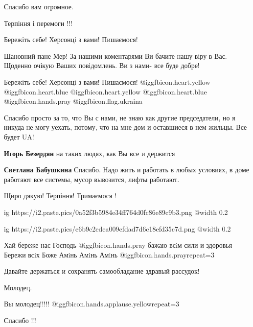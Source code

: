 \begin{itemize}
Спасибо вам огромное.

Терпіння і перемоги !!!

Бережіть себе! Херсонці з вами! Пишаємося!


Шановний пане Мер! За нашими коментарями Ви бачите нашу віру в Вас. Щоденно
очікую Ваших повідомлень. Ви з нами- все буде добре!

Бережіть себе! Херсонці з вами! Пишаємося!  @igg{fbicon.heart.yellow}  @igg{fbicon.heart.blue}  @igg{fbicon.heart.yellow}  @igg{fbicon.heart.blue}  @igg{fbicon.hands.pray} @igg{fbicon.flag.ukraina}


Спасибо просто за то, что Вы с нами, не знаю как другие председатели, но я
никуда не могу уехать, потому, что на мне дом и оставшиеся в нем жильцы. Все
будет UA!

\begin{itemize} %
\textbf{Игорь Безердян} на таких людях, как Вы все и держится

\textbf{Светлана Бабушкина} Спасибо. Надо жить и работать в любых условиях, в доме работают все системы, мусор вывозится, лифты работают.
\end{itemize} %

Щиро дякую! Терпіння! Тримаємося !


\ifcmt
  ig https://i2.paste.pics/0a52f3b5984e34ff764d0fc86e89c9b3.png
  @width 0.2
\fi


\ifcmt
  ig https://i2.paste.pics/e6b9c2edea009cfdad7d6c18efd35c7d.png
  @width 0.2
\fi


Хай береже нас Господь  @igg{fbicon.hands.pray}  бажаю всiм сили и здоровья Бережи всiх Боже Амiнь Амiнь Амiнь  @igg{fbicon.hands.pray}{repeat=3} 

Давайте держаться и сохранять самообладание здравый рассудок!

Молодец.

Вы молодец!!!!! @igg{fbicon.hands.applause.yellow}{repeat=3} 

Спасибо !!!


\end{itemize}
